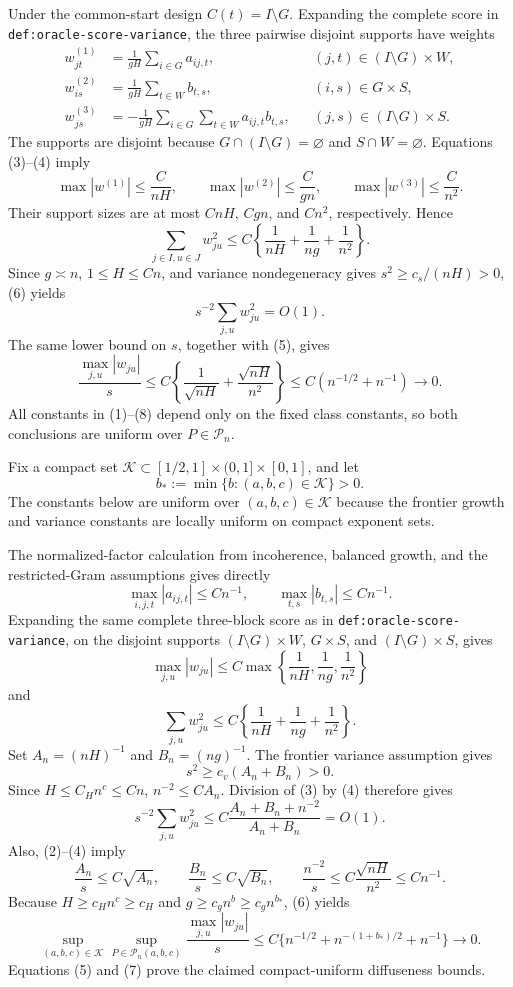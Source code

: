 Under the common-start design \(C(t)=I\setminus G\).  Expanding the complete score in \texttt{def:oracle-score-variance}, the three pairwise disjoint supports have weights
\[
 \begin{aligned}
 w^{(1)}_{jt}&=\frac1{gH}\sum_{i\in G}a_{ij,t},
 &&(j,t)\in(I\setminus G)\times W,\\
 w^{(2)}_{is}&=\frac1{gH}\sum_{t\in W}b_{t,s},
 &&(i,s)\in G\times S,\\
 w^{(3)}_{js}&=-\frac1{gH}\sum_{i\in G}\sum_{t\in W}
 a_{ij,t}b_{t,s},
 &&(j,s)\in(I\setminus G)\times S.
 \end{aligned}
 \tag{4}
\]
The supports are disjoint because \(G\cap(I\setminus G)=\varnothing\) and \(S\cap W=\varnothing\).  Equations (3)--(4) imply
\[
 \max|w^{(1)}|\le\frac{C}{nH},
 \qquad
 \max|w^{(2)}|\le\frac{C}{gn},
 \qquad
 \max|w^{(3)}|\le\frac{C}{n^2}.
 \tag{5}
\]
Their support sizes are at most \(CnH\), \(Cgn\), and \(Cn^2\), respectively.  Hence
\[
 \sum_{j\in I,u\in J}w_{ju}^2
 \le C\left\{\frac1{nH}+\frac1{ng}+\frac1{n^2}\right\}.
 \tag{6}
\]
Since \(g\asymp n\), \(1\le H\le Cn\), and variance nondegeneracy gives \(s^2\ge c_s/(nH)>0\), (6) yields
\[
 s^{-2}\sum_{j,u}w_{ju}^2=O(1).
 \tag{7}
\]
The same lower bound on \(s\), together with (5), gives
\[
 \frac{\max_{j,u}|w_{ju}|}{s}
 \le C\left\{\frac1{\sqrt{nH}}+
 \frac{\sqrt{nH}}{n^2}\right\}
 \le C(n^{-1/2}+n^{-1})\longrightarrow0.
 \tag{8}
\]
All constants in (1)--(8) depend only on the fixed class constants, so both conclusions are uniform over \(P\in\mathcal P_n\).

Fix a compact set \(\mathcal K\subset[1/2,1]\times(0,1]\times[0,1]\), and let
\[
 b_*:=\min\{b:(a,b,c)\in\mathcal K\}>0.
\]
The constants below are uniform over \((a,b,c)\in\mathcal K\) because the frontier growth and variance constants are locally uniform on compact exponent sets.

The normalized-factor calculation from incoherence, balanced growth, and the restricted-Gram assumptions gives directly
\[
 \max_{i,j,t}|a_{ij,t}|\le Cn^{-1},
 \qquad
 \max_{t,s}|b_{t,s}|\le Cn^{-1}.
 \tag{1}
\]
Expanding the same complete three-block score as in \texttt{def:oracle-score-variance}, on the disjoint supports \((I\setminus G)\times W\), \(G\times S\), and \((I\setminus G)\times S\), gives
\[
 \max_{j,u}|w_{ju}|
 \le C\max\left\{\frac1{nH},\frac1{ng},\frac1{n^2}\right\}
 \tag{2}
\]
and
\[
 \sum_{j,u}w_{ju}^2
 \le C\left\{\frac1{nH}+\frac1{ng}+\frac1{n^2}\right\}.
 \tag{3}
\]
Set \(A_n=(nH)^{-1}\) and \(B_n=(ng)^{-1}\).  The frontier variance assumption gives
\[
 s^2\ge c_v(A_n+B_n)>0.
 \tag{4}
\]
Since \(H\le C_Hn^c\le Cn\), \(n^{-2}\le CA_n\).  Division of (3) by (4) therefore gives
\[
 s^{-2}\sum_{j,u}w_{ju}^2
 \le C\frac{A_n+B_n+n^{-2}}{A_n+B_n}=O(1).
 \tag{5}
\]
Also, (2)--(4) imply
\[
 \frac{A_n}{s}\le C\sqrt{A_n},
 \qquad
 \frac{B_n}{s}\le C\sqrt{B_n},
 \qquad
 \frac{n^{-2}}s\le C\frac{\sqrt{nH}}{n^2}\le Cn^{-1}.
 \tag{6}
\]
Because \(H\ge c_Hn^c\ge c_H\) and \(g\ge c_gn^b\ge c_gn^{b_*}\), (6) yields
\[
 \sup_{(a,b,c)\in\mathcal K}\sup_{P\in\mathcal P_n(a,b,c)}
 \frac{\max_{j,u}|w_{ju}|}{s}
 \le C\{n^{-1/2}+n^{-(1+b_*)/2}+n^{-1}\}
 \longrightarrow0.
 \tag{7}
\]
Equations (5) and (7) prove the claimed compact-uniform diffuseness bounds.

